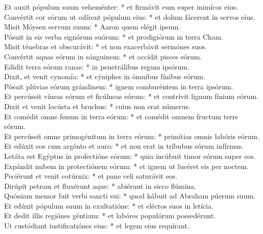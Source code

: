 {	Et auxit pópulum suum veheménter: * et firmávit eum super inimícos eius. \\
	Convértit cor eórum ut odírent pópulum eius: * et dolum fácerent in servos eius. \\
	Misit Móysen servum suum: * Aaron quem elégit ipsum. \\
	Pósuit in eis verba signórum suórum: * et prodigiórum in terra Cham. \\
	Misit ténebras et obscurávit: * et non exacerbávit sermónes suos. \\
	Convértit aquas eórum in sánguinem: * et occídit pisces eórum. \\
	Edidit terra eórum ranas: * in penetrálibus regum ipsórum. \\
	Dixit, et venit cynomía: * et cýniphes in ómnibus fínibus eórum. \\
	Pósuit plúvias eórum grándinem: * ignem comburéntem in terra ipsórum. \\
	Et percússit víneas eórum et ficúlneas eórum: * et contrívit lignum fínium eórum. \\
	Dixit et venit locústa et bruchus: * cuius non erat númerus. \\
	Et comédit omne fenum in terra eórum: * et comédit omnem fructum terre eórum. \\
	Et percússit omne primogénitum in terra eórum: * primítias omnis labóris eórum. \\
	Et edúxit eos cum argénto et auro: * et non erat in tríbubus eórum infírmus. \\
	Letáta est Egýptus in profectióne eórum: * quia incúbuit timor eórum super eos. \\
	Expándit nubem in protectiónem eórum: * et ignem ut lucéret eis per noctem. \\
	Peciérunt et venit cotúrnix: * et pane celi saturávit eos. \\
	Dirúpit petram et fluxérunt aque: * abiérunt in sicco flúmina. \\
	Quóniam memor fuit verbi sancti sui: * quod hábuit ad Abraham púerum suum. \\
	Et edúxit pópulum suum in exultatióne: * et eléctos suos in letícia. \\
	Et dedit illis regiónes géntium: * et labóres populórum possedérunt. \\
	Ut custódiant iustificatiónes eius: * et legem eius requírant.
}

